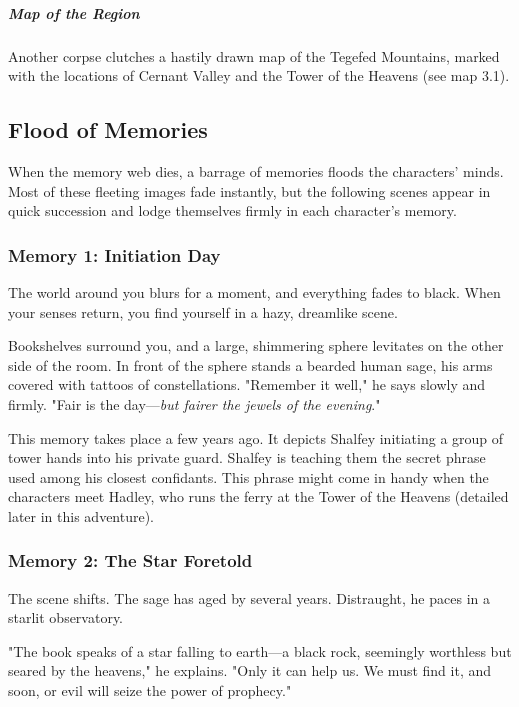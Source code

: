 \documentclass[10pt,a4paper,twoside,bg=print,twocolumn,openany,nodeprecatedcode]{dndbook}
\begin{document}
\subparagraph{Map of the Region}
Another corpse clutches a hastily drawn map of the Tegefed Mountains, marked with the locations of Cernant Valley and the Tower of the Heavens (see map 3.1).

\subsection{Flood of Memories}
When the memory web dies, a barrage of memories floods the characters' minds. Most of these fleeting images fade instantly, but the following scenes appear in quick succession and lodge themselves firmly in each character's memory.

\subsubsection{Memory 1: Initiation Day}
\begin{DndReadAloud}{}
The world around you blurs for a moment, and everything fades to black. When your senses return, you find yourself in a hazy, dreamlike scene.

Bookshelves surround you, and a large, shimmering sphere levitates on the other side of the room. In front of the sphere stands a bearded human sage, his arms covered with tattoos of constellations. "Remember it well," he says slowly and firmly. "Fair is the day—\textit{but fairer the jewels of the evening}."

\end{DndReadAloud}

This memory takes place a few years ago. It depicts Shalfey initiating a group of tower hands into his private guard. Shalfey is teaching them the secret phrase used among his closest confidants. This phrase might come in handy when the characters meet Hadley, who runs the ferry at the Tower of the Heavens (detailed later in this adventure).

\subsubsection{Memory 2: The Star Foretold}
\begin{DndReadAloud}{}
The scene shifts. The sage has aged by several years. Distraught, he paces in a starlit observatory.

"The book speaks of a star falling to earth—a black rock, seemingly worthless but seared by the heavens," he explains. "Only it can help us. We must find it, and soon, or evil will seize the power of prophecy."

\end{DndReadAloud}
\end{document}
